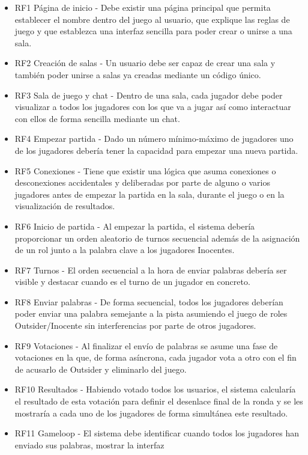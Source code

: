\begin{itemize}
	\item RF1 Página de inicio - Debe existir una página principal que permita establecer el nombre dentro del juego al usuario,
	      que explique las reglas de juego y que establezca una interfaz sencilla para poder crear o unirse a una sala.
	\item RF2 Creación de salas - Un usuario debe ser capaz de crear una sala y también poder unirse a salas ya creadas mediante un
	      código único.
	\item RF3 Sala de juego y chat - Dentro de una sala, cada jugador debe poder visualizar a todos los jugadores con los que va a jugar
	      así como interactuar con ellos de forma sencilla mediante un chat.
	\item RF4 Empezar partida - Dado un número mínimo-máximo de jugadores uno de los jugadores debería tener la capacidad
	      para empezar una nueva partida.
	\item RF5 Conexiones - Tiene que existir una lógica que asuma conexiones o desconexiones accidentales y deliberadas por parte
	      de alguno o varios jugadores antes de empezar la partida en la sala, durante el juego o en la visualización de resultados.
	\item RF6 Inicio de partida - Al empezar la partida, el sistema debería proporcionar un orden aleatorio de turnos secuencial además de
	      la asignación de un rol junto a la palabra clave a los jugadores Inocentes.
	\item RF7 Turnos - El orden secuencial a la hora de enviar palabras debería ser visible y destacar cuando es el turno
	      de un jugador en concreto.
	\item RF8 Enviar palabras - De forma secuencial, todos los jugadores deberían poder enviar una palabra semejante a la pista asumiendo
	      el juego de roles Outsider/Inocente sin interferencias por parte de otros jugadores.
	\item RF9 Votaciones - Al finalizar el envío de palabras se asume una fase de votaciones en la que, de forma asíncrona,
	      cada jugador vota a otro con el fin de acusarlo de Outsider y eliminarlo del juego.
	\item RF10 Resultados - Habiendo votado todos los usuarios, el sistema calcularía el resultado de esta votación para definir el
	      desenlace final de la ronda y se les mostraría a cada uno de los jugadores de forma simultánea este resultado.
	\item RF11 Gameloop - El sistema debe identificar cuando todos los jugadores han enviado sus palabras, mostrar la interfaz

\end{itemize}
